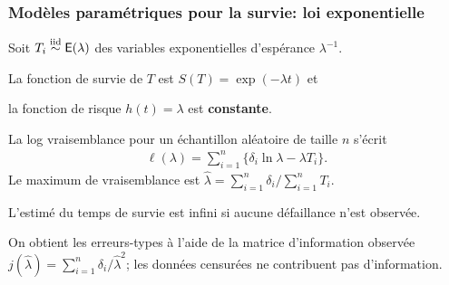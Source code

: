 \documentclass{beamer}
\begin{document}
\begin{frame}
\frametitle{Modèles paramétriques pour la survie: loi exponentielle}
Soit  $T_i \stackrel{\textnormal{iid}}{\sim} \mathsf{E}(\lambda)$ des variables exponentielles d'espérance $\lambda^{-1}$.
\bi \item 
La fonction de survie de $T$ est $S(T) = \exp(-\lambda t)$ et 
\item la fonction de risque $h(t)=\lambda$ est \textbf{constante}.
\ei

La log vraisemblance pour un échantillon aléatoire de taille $n$ s'écrit
\begin{align*}
\ell(\lambda) =\sum_{i=1}^n \{\delta_i \ln \lambda - \lambda T_i\}.
\end{align*}
Le maximum de vraisemblance est $\widehat{\lambda} =\sum_{i=1}^n \delta_i/ \sum_{i=1}^n T_i $. 

\bi \item L'estimé du temps de survie est infini si aucune défaillance n'est observée.
\item On obtient les erreurs-types à l'aide de la matrice d'information observée $j(\widehat{\lambda}) = \sum_{i=1}^n \delta_i/\widehat{\lambda}^2$; les données censurées ne contribuent pas d'information.
\ei

\end{frame}

\end{document}
